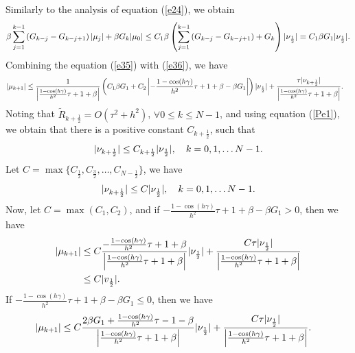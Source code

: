 \documentclass[3p,times]{elsarticle}
\begin{document}
Similarly to the analysis of equation (\ref{e24}), we obtain
\begin{equation}\label{e36}
\aligned
\beta\sum\limits_{j=1}^{k-1}\left(G_{k-j}-G_{k-j+1}\right)|\mu_j|+\beta G_k|\mu_0|\leq C_1\beta\left(\sum\limits_{j=1}^{k-1}\left(G_{k-j}-G_{k-j+1}\right)+G_k\right)|\nu_{\frac{1}{2}}|=C_1\beta G_1|\nu_{\frac{1}{2}}|.
\endaligned
\end{equation}
Combining the equation (\ref{e35}) with (\ref{e36}), we have
\begin{equation}\label{e37}
\aligned
&|\mu_{k+1}|
\leq\frac{1}{\left|\frac{1-\cos(h\gamma)}{h^2}\tau+1+\beta\right|}\left(C_1\beta G_1+C_2\left|-\frac{1-\cos(h\gamma)}{h^2}\tau+1+\beta-\beta G_1\right|\right)|\nu_{\frac{1}{2}}|+\frac{\tau|\nu_{k+\frac{1}{2}}|}{\left|\frac{1-\cos(h\gamma)}{h^2}\tau+1+\beta\right|}.
\endaligned
\end{equation}
Noting that $\widetilde{R}_{k+\frac{1}{2}}=O(\tau^{2}+h^2)$, $\forall 0\leq k\leq N-1$, and using equation (\ref{Pe1}), we obtain that there is a positive constant $C_{k+\frac{1}{2}}$, such that
\begin{equation*}
\aligned
|\nu_{k+\frac{1}{2}}|\leq C_{k+\frac{1}{2}}|\nu_\frac{1}{2}|, \quad k=0,1,\ldots N-1.
\endaligned
\end{equation*}
Let $C=\max\{C_{\frac{1}{2}},C_{\frac{3}{2}},\ldots,C_{N-\frac{1}{2}}\}$, we have
\begin{equation*}
\aligned
|\nu_{k+\frac{1}{2}}|\leq C|\nu_\frac{1}{2}|, \quad k=0,1,\ldots N-1.
\endaligned
\end{equation*}
Now, let $C=\max(C_1,C_2)$, and if $-\frac{1-\cos(h\gamma)}{h^2}\tau+1+\beta-\beta G_1>0$, then we have
\begin{equation}\label{e38}
\aligned
|\mu_{k+1}|
&\leq C\frac{-\frac{1-\cos(h\gamma)}{h^2}\tau+1+\beta}{\left|\frac{1-\cos(h\gamma)}{h^2}\tau+1+\beta\right|}|\nu_{\frac{1}{2}}|+\frac{C\tau|\nu_{\frac{1}{2}}|}{\left|\frac{1-\cos(h\gamma)}{h^2}\tau+1+\beta\right|}\\
&\leq C|v_{\frac{1}{2}}|.
\endaligned
\end{equation}
If $-\frac{1-\cos(h\gamma)}{h^2}\tau+1+\beta-\beta G_1\leq0$, then we have
\begin{equation}\label{e39}
\aligned
&|\mu_{k+1}|
\leq C\frac{2\beta G_1+\frac{1-\cos(h\gamma)}{h^2}\tau-1-\beta}{\left|\frac{1-\cos(h\gamma)}{h^2}\tau+1+\beta\right|}|\nu_{\frac{1}{2}}|+\frac{C\tau|\nu_{\frac{1}{2}}|}{\left|\frac{1-\cos(h\gamma)}{h^2}\tau+1+\beta\right|}.
\endaligned
\end{equation}
\end{document}
